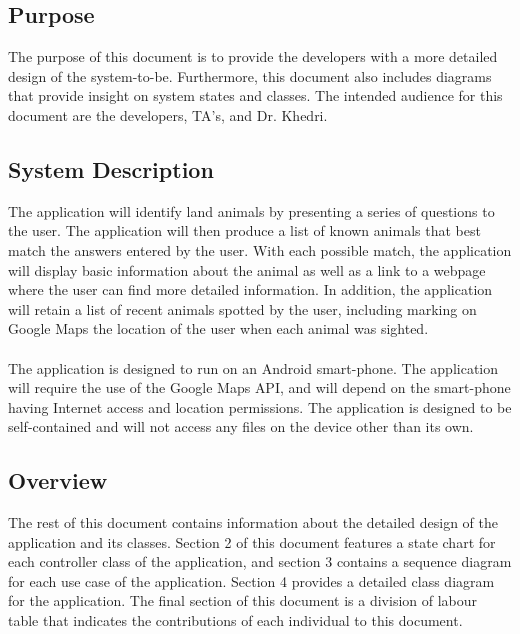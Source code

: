 \documentclass[]{article}
\begin{document}
\subsection{Purpose}
\label{sub:purpose}

The purpose of this document is to provide the developers with a more detailed design of the system-to-be. Furthermore, this document also includes diagrams that provide insight on system states and classes. The intended audience for this document are the developers, TA's, and Dr. Khedri.


\subsection{System Description}
\label{sub:system_description}

The application will identify land animals by presenting a series of questions to the user. The application will then produce a list of known animals that best match the answers entered by the user. With each possible match, the application will display basic information about the animal as well as a link to a webpage where the user can find more detailed information. In addition, the application will retain a list of recent animals spotted by the user, including marking on Google Maps the location of the user when each animal was sighted.
\\
\\
The application is designed to run on an Android smart-phone. The application will require the use of the Google Maps API, and will depend on the smart-phone having Internet access and location permissions. The application is designed to be self-contained and will not access any files on the device other than its own.


\subsection{Overview}
\label{sub:overview}

The rest of this document contains information about the detailed design of the application and its classes. Section 2 of this document features a state chart for each controller class of the application, and section 3 contains a sequence diagram for each use case of the application. Section 4 provides a detailed class diagram for the application. The final section of this document is a division of labour table that indicates the contributions of each individual to this document.
\end{document}
